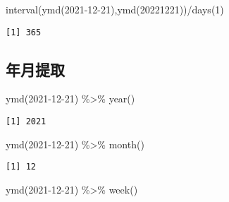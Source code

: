 \documentclass[
  letterpaper,
  DIV=11,
  numbers=noendperiod]{scrreprt}
\newenvironment{Shaded}{\begin{snugshade}}{\end{snugshade}}
\newcommand{\DecValTok}[1]{\textcolor[rgb]{0.68,0.00,0.00}{#1}}
\newcommand{\FunctionTok}[1]{\textcolor[rgb]{0.28,0.35,0.67}{#1}}
\newcommand{\NormalTok}[1]{\textcolor[rgb]{0.00,0.23,0.31}{#1}}
\newcommand{\SpecialCharTok}[1]{\textcolor[rgb]{0.37,0.37,0.37}{#1}}
\newcommand{\StringTok}[1]{\textcolor[rgb]{0.13,0.47,0.30}{#1}}
\begin{document}
\begin{Shaded}
\begin{Highlighting}[]
\FunctionTok{interval}\NormalTok{(}\FunctionTok{ymd}\NormalTok{(}\StringTok{\textquotesingle{}2021{-}12{-}21\textquotesingle{}}\NormalTok{),}\FunctionTok{ymd}\NormalTok{(}\StringTok{\textquotesingle{}20221221\textquotesingle{}}\NormalTok{))}\SpecialCharTok{/}\FunctionTok{days}\NormalTok{(}\DecValTok{1}\NormalTok{)}
\end{Highlighting}
\end{Shaded}

\begin{verbatim}
[1] 365
\end{verbatim}

\subsection{年月提取}\label{ux5e74ux6708ux63d0ux53d6}

\begin{Shaded}
\begin{Highlighting}[]
\FunctionTok{ymd}\NormalTok{(}\StringTok{\textquotesingle{}2021{-}12{-}21\textquotesingle{}}\NormalTok{) }\SpecialCharTok{\%\textgreater{}\%} \FunctionTok{year}\NormalTok{()}
\end{Highlighting}
\end{Shaded}

\begin{verbatim}
[1] 2021
\end{verbatim}

\begin{Shaded}
\begin{Highlighting}[]
\FunctionTok{ymd}\NormalTok{(}\StringTok{\textquotesingle{}2021{-}12{-}21\textquotesingle{}}\NormalTok{) }\SpecialCharTok{\%\textgreater{}\%} \FunctionTok{month}\NormalTok{()}
\end{Highlighting}
\end{Shaded}

\begin{verbatim}
[1] 12
\end{verbatim}

\begin{Shaded}
\begin{Highlighting}[]
\FunctionTok{ymd}\NormalTok{(}\StringTok{\textquotesingle{}2021{-}12{-}21\textquotesingle{}}\NormalTok{) }\SpecialCharTok{\%\textgreater{}\%} \FunctionTok{week}\NormalTok{()}
\end{Highlighting}
\end{Shaded}
\end{document}
